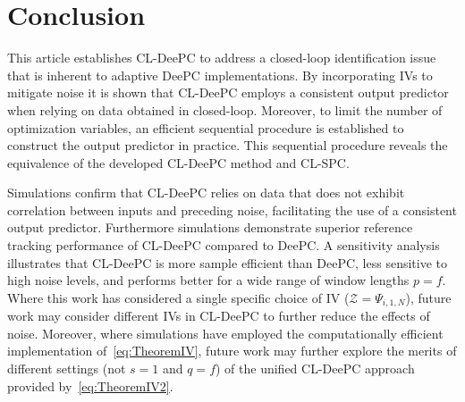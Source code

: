 \section{Conclusion}\label{sec:conclusion}
\noindent This article establishes \ac{CL-DeePC} to address a closed-loop identification issue that is inherent to adaptive \ac{DeePC} implementations. By incorporating \ac{IVs} to mitigate noise it is shown that \ac{CL-DeePC} employs a consistent output predictor when relying on data obtained in closed-loop. Moreover, to limit the number of optimization variables, an efficient sequential procedure is established to construct the output predictor in practice. This sequential procedure reveals the equivalence of the developed \ac{CL-DeePC} method and \ac{CL-SPC}.

Simulations confirm that \ac{CL-DeePC} relies on data that does not exhibit correlation between inputs and preceding noise, facilitating the use of a consistent output predictor. Furthermore simulations demonstrate superior reference tracking performance of \ac{CL-DeePC} compared to \ac{DeePC}. A sensitivity analysis illustrates that \ac{CL-DeePC} is more sample efficient than \ac{DeePC}, less sensitive to high noise levels, and performs better for a wide range of window lengths $p=f$. Where this work has considered a single specific choice of \acs{IV} ($\mathcal{Z}=\Psi_{i,1,N}$), future work may consider different \ac{IVs} in \ac{CL-DeePC} to further reduce the effects of noise. Moreover, where simulations have employed the computationally efficient implementation of~\eqref{eq:TheoremIV}, future work may further explore the merits of different settings (not $s=1$ and $q=f$) of the unified \ac{CL-DeePC} approach provided by~\eqref{eq:TheoremIV2}.